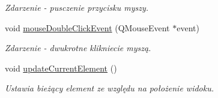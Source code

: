 \begin{DoxyCompactItemize}
\begin{DoxyCompactList}\small\item\em Zdarzenie -\/ pusczenie przycisku myszy. \item\end{DoxyCompactList}\item 
\hypertarget{class_tree_view_ade37ecae103914fe370ef0ce9f6bf5ed}{
void \hyperlink{class_tree_view_ade37ecae103914fe370ef0ce9f6bf5ed}{mouseDoubleClickEvent} (QMouseEvent $\ast$event)}
\label{class_tree_view_ade37ecae103914fe370ef0ce9f6bf5ed}

\begin{DoxyCompactList}\small\item\em Zdarzenie -\/ dwukrotne klikniecie myszą. \item\end{DoxyCompactList}\item 
\hypertarget{class_tree_view_a93408f2e9d2b97d24e03cbb4565ee461}{
void \hyperlink{class_tree_view_a93408f2e9d2b97d24e03cbb4565ee461}{updateCurrentElement} ()}
\label{class_tree_view_a93408f2e9d2b97d24e03cbb4565ee461}

\begin{DoxyCompactList}\small\item\em Ustawia bieżący element ze względu na położenie widoku. \item\end{DoxyCompactList}\end{DoxyCompactItemize}
